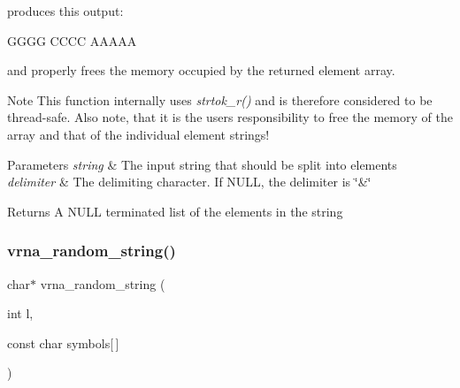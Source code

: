  produces this output\+:

\begin{DoxyVerb}GGGG
CCCC
AAAAA
\end{DoxyVerb}
 and properly free\textquotesingle{}s the memory occupied by the returned element array.

\begin{DoxyNote}{Note}
This function internally uses {\itshape strtok\+\_\+r()} and is therefore considered to be thread-\/safe. Also note, that it is the users responsibility to free the memory of the array and that of the individual element strings!
\end{DoxyNote}

\begin{DoxyParams}{Parameters}
{\em string} & The input string that should be split into elements \\
\hline
{\em delimiter} & The delimiting character. If {\ttfamily N\+U\+LL}, the delimiter is {\ttfamily \char`\"{}\&\char`\"{}} \\
\hline
\end{DoxyParams}
\begin{DoxyReturn}{Returns}
A {\ttfamily N\+U\+LL} terminated list of the elements in the string 
\end{DoxyReturn}
\mbox{\label{group__string__utils_ga4eeb3750dcf860b9f3158249f95dbd7f}} 
\subsubsection{\texorpdfstring{vrna\+\_\+random\+\_\+string()}{vrna\_random\_string()}}
{\footnotesize\ttfamily char$\ast$ vrna\+\_\+random\+\_\+string (\begin{DoxyParamCaption}\item[{int}]{l,  }\item[{const char}]{symbols\mbox{[}$\,$\mbox{]} }\end{DoxyParamCaption})}



